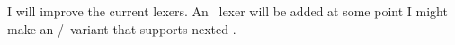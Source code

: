 \stopsubject

\StopSteps

\page

\StartSteps

\startsubject[title=The future]

    \startitemize[packed]
    \startitem I will improve the current lexers. \stopitem \FlushStep
    \startitem An \SQL\ lexer will be added at some point \stopitem \FlushStep
    \startitem I might make an \HTML/\CSS\ variant that supports nexted \LMX. \stopitem \FlushStep
    \stopitemize

\stopsubject

\StopSteps

\stopdocument
